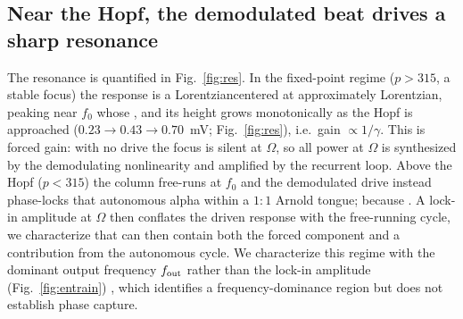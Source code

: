 \documentclass[11pt,a4paper]{article}
\providecommand{\DIFaddtex}[1]{{\protect\color{blue} \sf #1}} %
\providecommand{\DIFdeltex}[1]{{\protect\color{red} \scriptsize #1}} %
\providecommand{\DIFaddbegin}{} %
\providecommand{\DIFaddend}{} %
\providecommand{\DIFdelbegin}{} %
\providecommand{\DIFdelend}{} %
\providecommand{\DIFadd}[1]{\texorpdfstring{\DIFaddtex{#1}}{#1}} %
\providecommand{\DIFdel}[1]{\texorpdfstring{\DIFdeltex{#1}}{}} %
\begin{document}
\subsection{Near the Hopf, the demodulated beat drives a sharp resonance}
The resonance is quantified in Fig.~\ref{fig:res}. In the
fixed-point regime ($p>315$, a stable focus) the response is \DIFdelbegin \DIFdel{a Lorentziancentered at
}\DIFdelend \DIFaddbegin \DIFadd{approximately Lorentzian,
peaking near }\DIFaddend $f_0$\DIFdelbegin \DIFdel{whose }\DIFdelend \DIFaddbegin \DIFadd{, and its }\DIFaddend height grows monotonically as the Hopf is approached
($0.23\!\to\!0.43\!\to\!0.70$~mV; Fig.~\ref{fig:res}), i.e.\ gain $\propto1/\gamma$. This
is forced gain: with no drive the focus is silent at $\Omega$, so all power at
$\Omega$ is synthesized by the demodulating nonlinearity and amplified by the recurrent
loop. Above the Hopf ($p<315$) the
column free-runs at $f_0$\DIFdelbegin \DIFdel{and the demodulated drive instead phase-locks that autonomous
alpha within a $1{:}1$ Arnold tongue; because }\DIFdelend \DIFaddbegin \DIFadd{. A }\DIFaddend lock-in \DIFdelbegin \DIFdel{amplitude }\DIFdelend at $\Omega$ \DIFdelbegin \DIFdel{then conflates
the driven response with the free-running cycle, we characterize that }\DIFdelend \DIFaddbegin \DIFadd{can then contain both the forced
component and a contribution from the autonomous cycle. We characterize this }\DIFaddend regime
with the \DIFaddbegin \DIFadd{dominant }\DIFaddend output frequency $f_{\rm out}$ \DIFdelbegin \DIFdel{rather than the lock-in amplitude }\DIFdelend (Fig.~\ref{fig:entrain})\DIFaddbegin \DIFadd{, which
identifies a frequency-dominance region but does not establish phase capture}\DIFaddend .
\end{document}
